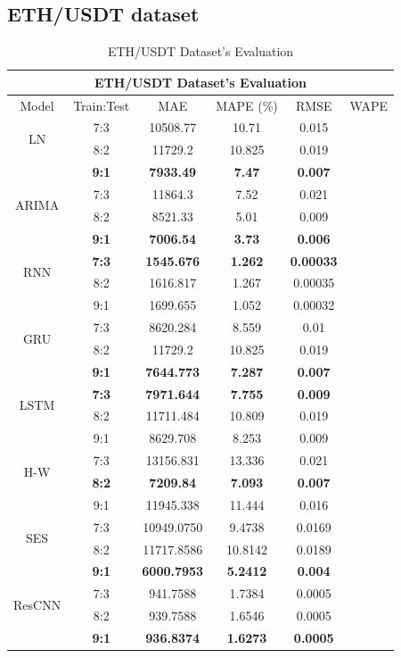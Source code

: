 \documentclass{ieeeojies}
\begin{document}
\subsection{ETH/USDT dataset} 
\begin{table}[H]
    \centering
    \begin{tabular}{|c|c|c|c|c|c|}
         \hline
         \multicolumn{6}{|c|}{\textbf{ETH/USDT Dataset's Evaluation}}\\
         \hline
         \centering Model & Train:Test & MAE & MAPE (\%) & RMSE & WAPE\\
         \hline
         \multirow{2}{*}{LN} & 7:3 & 10508.77 & 10.71 & 0.015 \\ & 8:2 & 11729.2 & 10.825 & 0.019 \\ & \textbf{9:1} & \textbf{7933.49} & \textbf{7.47} & \textbf{0.007}\\
         \hline
         \multirow{2}{*}{ARIMA} & 7:3&11864.3&7.52&0.021\\ & 8:2&8521.33&5.01&0.009 \\ & \textbf{9:1} & \textbf{7006.54} & \textbf{3.73} & \textbf{0.006}\\
         \hline
         \multirow{2}{*}{RNN} & \textbf{7:3}	& \textbf{1545.676} & \textbf{1.262} & \textbf{0.00033} \\ & 8:2 & 1616.817 & 1.267 & 0.00035 \\ & 9:1 & 1699.655  & 1.052 & 0.00032\\
         \hline
         \multirow{2}{*}{GRU} & 7:3 &  8620.284 &  8.559 & 0.01 \\ & 8:2 &  11729.2 & 10.825 & 0.019 \\ & \textbf{9:1} & \textbf{7644.773}  & \textbf{7.287} & \textbf{0.007}\\
         \hline
         \multirow{2}{*}{LSTM} & \textbf{7:3}	& \textbf{7971.644} & \textbf{7.755} & \textbf{0.009} \\ & 8:2 & 11711.484 & 10.809 & 0.019 \\ & 9:1 & 8629.708 & 8.253 & 0.009\\
         \hline
         \multirow{2}{*}{H-W} & 7:3 & 13156.831&13.336 & 0.021 \\ & \textbf{8:2} &	\textbf{7209.84} & \textbf{7.093} & \textbf{0.007} \\ & 9:1 &11945.338	&11.444&0.016\\
         \hline
         \multirow{2}{*}{SES} & 7:3 & 10949.0750 & 9.4738 & 0.0169 \\ & 8:2 & 11717.8586 &10.8142 & 0.0189 \\ & \textbf{9:1} &  	\textbf{6000.7953} &	\textbf{5.2412} & 	\textbf{0.004} \\
         \hline
         \multirow{2}{*}{ResCNN} & 7:3 & 941.7588 &  1.7384 &  0.0005 \\ & 8:2 & 939.7588 &  1.6546 &  0.0005 \\ & \textbf{9:1} & \textbf{936.8374} & \textbf{1.6273} & \textbf{0.0005}\\
         \hline
    \end{tabular}
    \caption{ETH/USDT Dataset's Evaluation}
    \label{ethresult}
\end{table}
\end{document}
